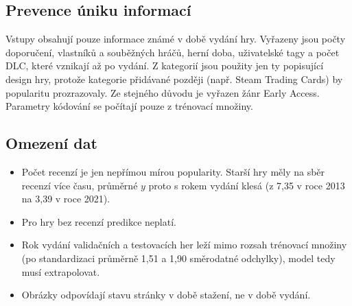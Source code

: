 \subsection*{Prevence úniku informací}

Vstupy obsahují pouze informace známé v době vydání hry. Vyřazeny jsou počty doporučení,
vlastníků a souběžných hráčů, herní doba, uživatelské tagy a počet DLC, které vznikají až po
vydání. Z kategorií jsou použity jen ty popisující design hry, protože kategorie přidávané
později (např. Steam Trading Cards) by popularitu prozrazovaly. Ze stejného důvodu je vyřazen
žánr Early Access. Parametry kódování se počítají pouze z trénovací množiny.

\subsection*{Omezení dat}

\begin{itemize}
    \item Počet recenzí je jen nepřímou mírou popularity. Starší hry měly na sběr recenzí
    více času, průměrné $y$ proto s rokem vydání klesá (z 7,35 v roce 2013 na 3,39 v roce 2021).
    \item Pro hry bez recenzí predikce neplatí.
    \item Rok vydání validačních a testovacích her leží mimo rozsah trénovací množiny
    (po standardizaci průměrně 1,51 a 1,90 směrodatné odchylky), model tedy musí extrapolovat.
    \item Obrázky odpovídají stavu stránky v době stažení, ne v době vydání.
\end{itemize}